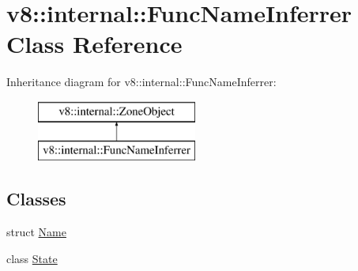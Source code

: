 \hypertarget{classv8_1_1internal_1_1_func_name_inferrer}{}\section{v8\+:\+:internal\+:\+:Func\+Name\+Inferrer Class Reference}
\label{classv8_1_1internal_1_1_func_name_inferrer}
Inheritance diagram for v8\+:\+:internal\+:\+:Func\+Name\+Inferrer\+:\begin{figure}[H]
\begin{center}
\leavevmode
\includegraphics[height=2.000000cm]{classv8_1_1internal_1_1_func_name_inferrer}
\end{center}
\end{figure}
\subsection*{Classes}
\begin{DoxyCompactItemize}
\item 
struct \hyperlink{structv8_1_1internal_1_1_func_name_inferrer_1_1_name}{Name}
\item 
class \hyperlink{classv8_1_1internal_1_1_func_name_inferrer_1_1_state}{State}
\end{DoxyCompactItemize}
